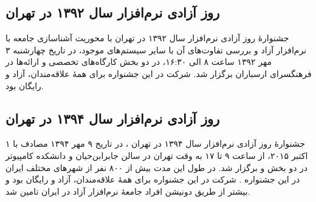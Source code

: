 \documentclass{article}
\begin{document}
\subsection{روز آزادی نرم‌افزار سال ۱۳۹۲ در تهران}
جشنوارهٔ روز آزادی نرم‌افزار سال ۱۳۹۲ در تهران با محوریت آشناسازی جامعه با نرم‌افزار آزاد و بررسی تفاوت‌های آن با سایر سیستم‌های موجود، در تاریخ چهارشنبه ۳ مهر ۱۳۹۲ ساعت ۸ الی ۱۶:۳۰، در دو بخش کارگاه‌های تخصصی و ارائه‌ها در فرهنگسرای ارسباران برگزار شد. شرکت در این جشنواره برای همهٔ علاقه‌مندان، آزاد و رایگان بود.

\subsection{روز آزادی نرم‌افزار سال ۱۳۹۴ در تهران}
جشنوارهٔ روز آزادی نرم‌افزار سال ۱۳۹۴ در تهران ، در تاریخ ۹ مهر ۱۳۹۴ مصادف با ۱ اکتبر ۲۰۱۵، از ساعت ۹ تا ۱۷ به وقت تهران در سالن جابرابن‌حیان و دانشکده کامپیوتر  در دو بخش  و  برگزار شد.  در طول این مدت بیش از ۸۰۰ نفر از شهرهای مختلف ایران در این جشنواره . شرکت در این جشنواره برای همهٔ علاقه‌مندان، آزاد و رایگان بود و بیشتر  از طریق دونیشن افراد جامعهٔ نرم‌افزار آزاد در ایران تامین شد.
\end{document}
